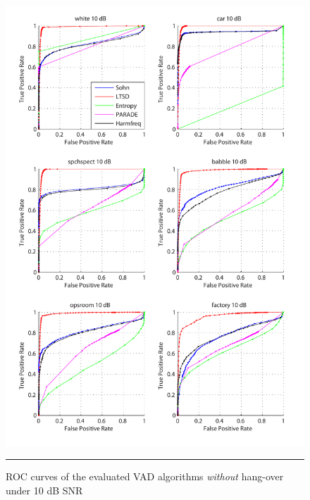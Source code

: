 \begin{figure}[htbp]
	\centering
		\includegraphics[width=1.0\columnwidth]{Figures/Chapter4/10dBnoh.pdf}
		\rule{37em}{0.5pt}
	\caption[ROC curves of the evaluated algorithms \emph{without} hang-over under 10 dB SNR]{ROC curves of the evaluated VAD algorithms \emph{without} hang-over under 10 dB SNR}
	\label{fig:10dBnoh}
\end{figure}

